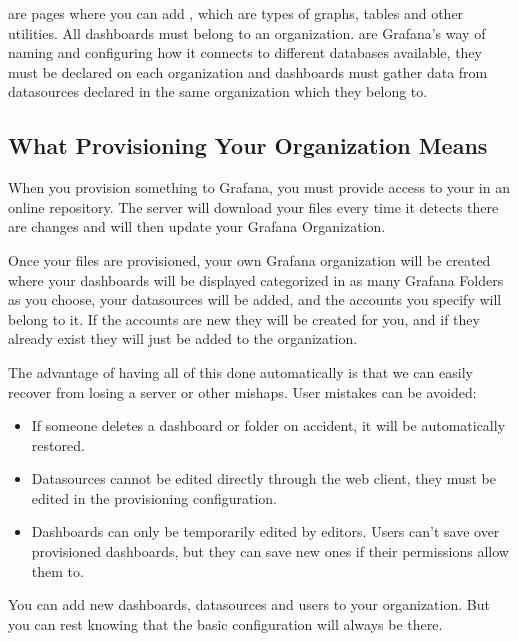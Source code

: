 \documentclass[letterpaper,10pt,english]{sphinxmanual}
\begin{document}
 are pages where you can add , which are types of
graphs, tables and other utilities. All dashboards must belong to an
organization.  are Grafana’s way of naming and configuring how
it connects to different databases available, they must be declared on each
organization and dashboards must gather data from datasources declared in the
same organization which they belong to.


\subsection{What Provisioning Your Organization Means}
\label{\detokenize{inputStructure:what-provisioning-your-organization-means}}
When you provision something to Grafana, you must provide access to your
 in an online repository. The server will download your files
every time it detects there are changes and will then update your Grafana
Organization.

Once your files are provisioned, your own Grafana organization will be created
where your dashboards will be displayed categorized in as many Grafana Folders
as you choose, your datasources will be added, and the accounts you specify
will belong to it. If the accounts are new they will be created for you, and if
they already exist they will just be added to the organization.

The advantage of having all of this done automatically is that we can easily
recover from losing a server or other mishaps. User mistakes can be avoided:
\begin{itemize}
\item {} 
If someone deletes a dashboard or folder on accident, it will be
automatically restored.

\item {} 
Datasources cannot be edited directly through the web client, they must be
edited in the provisioning configuration.

\item {} 
Dashboards can only be temporarily edited by editors. Users can’t save over
provisioned dashboards, but they can save new ones if their permissions allow
them to.

\end{itemize}

You can add new dashboards, datasources and users to your organization. But you
can rest knowing that the basic configuration will always be there.
\end{document}
